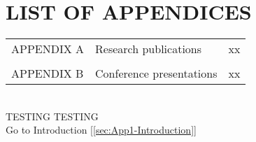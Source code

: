 \chapter{LIST OF APPENDICES}

\begin{tabular}{p{3.0cm}p{9.0cm}p{2.0cm}} 
APPENDIX A & Research publications & xx\\ %
\\
APPENDIX B & Conference presentations & xx\\ %
\end{tabular}
\\

TESTING TESTING\\

Go to Introduction [\ref{sec:App1-Introduction}] 